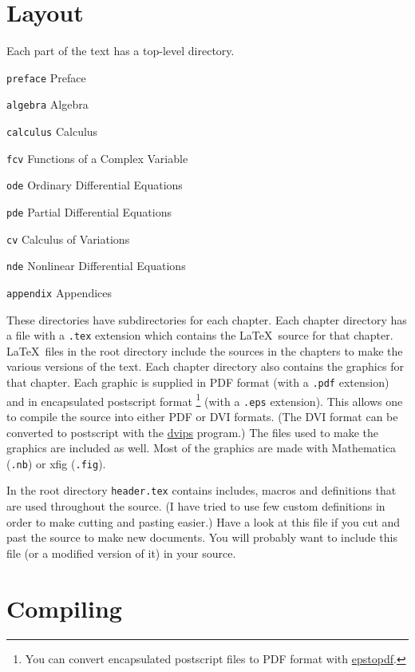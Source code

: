 \documentclass{article}
\begin{document}
\section{Layout}

Each part of the text has a top-level directory.
\begin{description}
\item{\verb+preface+} Preface
\item{\verb+algebra+} Algebra
\item{\verb+calculus+} Calculus
\item{\verb+fcv+} Functions of a Complex Variable
\item{\verb+ode+} Ordinary Differential Equations
\item{\verb+pde+} Partial Differential Equations
\item{\verb+cv+} Calculus of Variations
\item{\verb+nde+} Nonlinear Differential Equations
\item{\verb+appendix+} Appendices
\end{description}
These directories have subdirectories for each chapter.  Each chapter 
directory has a file with a \verb+.tex+ extension which contains the 
\LaTeX\ source for that chapter.  \LaTeX\ files in the root directory
include the sources in the chapters to make the various versions of 
the text.  Each chapter directory also contains the graphics for that
chapter.  Each graphic is supplied in PDF format (with a \verb+.pdf+
extension) and in encapsulated postscript format%
\footnote{You can convert encapsulated postscript files to PDF format
with
\href{http://www.ctan.org/tex-archive/support/epstopdf/}{epstopdf}.
}
(with a \verb+.eps+ extension).  This allows one to compile the source 
into either PDF or DVI formats.  (The DVI format can be converted to 
postscript with the 
\href{http://www.radicaleye.com/dvips.html}{dvips}
program.)  The files used to make the graphics are included as well.  Most
of the graphics are made with Mathematica (\verb+.nb+) or xfig (\verb+.fig+).

In the root directory \verb+header.tex+ contains includes, macros and 
definitions that are used throughout the source.  
(I have tried to use few custom definitions in order
to make cutting and pasting easier.)
Have a look at this file if you cut and past the source to make new documents.
You will probably want to include this file (or a modified version of it)
in your source.




\section{Compiling}
\end{document}
